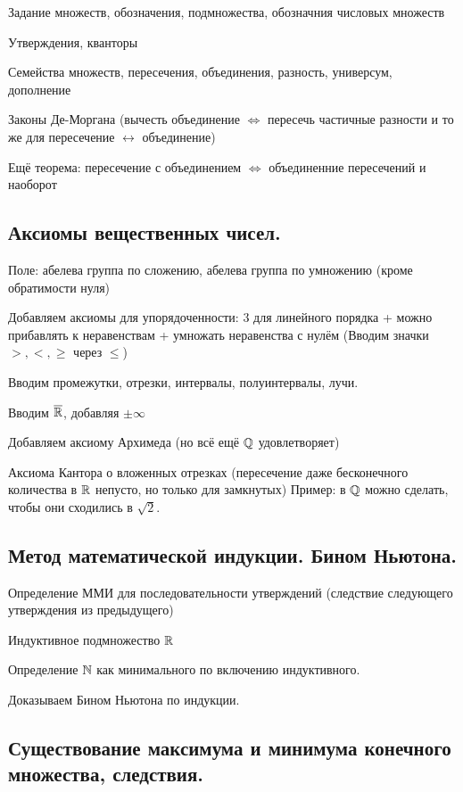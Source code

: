 \documentclass[12pt, a4paper]{article}
\begin{document}
Задание множеств, обозначения, подмножества, обозначния числовых множеств

Утверждения, кванторы

Семейства множеств, пересечения, объединения, разность, универсум, дополнение

Законы Де-Моргана (вычесть объединение $\Leftrightarrow$ пересечь частичные разности и то же для пересечение $\leftrightarrow$ объединение)

Ещё теорема: пересечение с объединением $\Leftrightarrow$ объединенние пересечений и наоборот


\subsection{Аксиомы вещественных чисел.}

Поле: абелева группа по сложению, абелева группа по умножению (кроме обратимости нуля)

Добавляем аксиомы для упорядоченности: 3 для линейного порядка + можно прибавлять к неравенствам + умножать неравенства с нулём
(Вводим значки $>, <, \geqslant$ через $\leqslant$)

Вводим промежутки, отрезки, интервалы, полуинтервалы, лучи.

Вводим $\overline{{\mathbb{R}}}$, добавляя $\pm \infty$

Добавляем аксиому Архимеда (но всё ещё ${\mathbb{Q}}$ удовлетворяет)

Аксиома Кантора о вложенных отрезках (пересечение даже бесконечного количества в ${\mathbb{R}}$ непусто, но только для замкнутых)
Пример: в ${\mathbb{Q}}$ можно сделать, чтобы они сходились в $\sqrt{2}$.


\subsection{Метод математической индукции. Бином Ньютона.}

Определение ММИ для последовательности утверждений (следствие следующего утверждения из предыдущего)

Индуктивное подмножество ${\mathbb{R}}$

Определение ${\mathbb{N}}$ как минимального по включению индуктивного.

Доказываем Бином Ньютона по индукции.

\subsection{Существование максимума и минимума конечного множества, следствия.}
\end{document}
